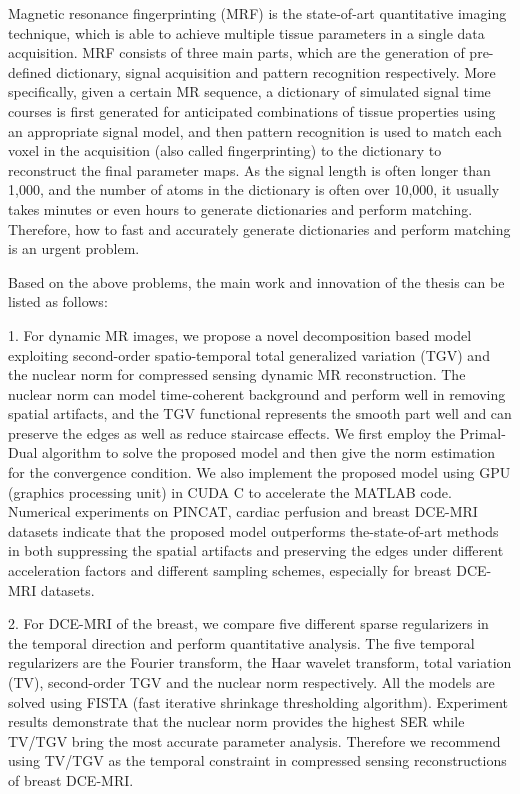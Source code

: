 \begin{englishabstract}
Magnetic resonance fingerprinting (MRF) is the state-of-art quantitative imaging technique, which is able to achieve multiple tissue parameters in a single data acquisition. MRF consists of three main parts, which are the generation of pre-defined dictionary, signal acquisition and pattern recognition respectively. More specifically, given a certain MR sequence, a dictionary of simulated signal time courses is first generated for anticipated combinations of tissue properties using an appropriate signal model, and then pattern recognition is used to match each voxel in the acquisition (also called fingerprinting) to the dictionary to reconstruct the final parameter maps. As the signal length is often longer than 1,000, and the number of atoms in the dictionary is often over 10,000, it usually takes minutes or even hours to generate dictionaries and perform matching. Therefore, how to fast and accurately generate dictionaries and perform matching is an urgent problem.

Based on the above problems, the main work and innovation of the thesis can be listed as follows:

1. For dynamic MR images, we propose a novel decomposition based model exploiting second-order spatio-temporal total generalized variation (TGV) and the nuclear norm for compressed sensing dynamic MR reconstruction. The nuclear norm can model time-coherent background and perform well in removing spatial artifacts, and the TGV functional represents the smooth part well and can preserve the edges as well as reduce staircase effects. We first employ the Primal-Dual algorithm to solve the proposed model and then give the norm estimation for the convergence condition. We also implement the proposed model using GPU (graphics processing unit) in CUDA C to accelerate the MATLAB code. Numerical experiments on PINCAT, cardiac perfusion and breast DCE-MRI datasets indicate that the proposed model outperforms the-state-of-art methods in both suppressing the spatial artifacts and preserving the edges under different acceleration factors and different sampling schemes, especially for breast DCE-MRI datasets.

2. For DCE-MRI of the breast, we compare five different sparse regularizers in the temporal direction and perform quantitative analysis. The five temporal regularizers are the Fourier transform, the Haar wavelet transform, total variation (TV), second-order TGV and the nuclear norm respectively. All the models are solved using FISTA (fast iterative shrinkage thresholding algorithm). Experiment results demonstrate that the nuclear norm provides the highest SER while TV/TGV bring the most accurate parameter analysis. Therefore we recommend using TV/TGV as the temporal constraint in compressed sensing reconstructions of breast DCE-MRI.


\end{englishabstract}
